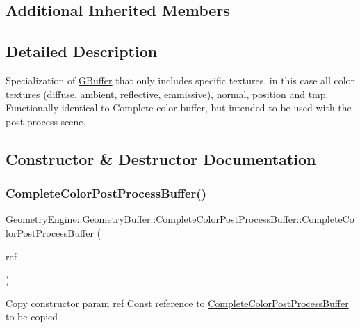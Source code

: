 \subsection*{Additional Inherited Members}


\subsection{Detailed Description}
Specialization of \mbox{\hyperlink{class_geometry_engine_1_1_geometry_buffer_1_1_g_buffer}{G\+Buffer}} that only includes specific textures, in this case all color textures (diffuse, ambient, reflective, emmissive), normal, position and tmp. Functionally identical to Complete color buffer, but intended to be used with the post process scene. 

\subsection{Constructor \& Destructor Documentation}
\mbox{\label{class_geometry_engine_1_1_geometry_buffer_1_1_complete_color_post_process_buffer_a7cce9b235baaf2d45b0a6e23c80a46e8}} 
\subsubsection{\texorpdfstring{CompleteColorPostProcessBuffer()}{CompleteColorPostProcessBuffer()}}
{\footnotesize\ttfamily Geometry\+Engine\+::\+Geometry\+Buffer\+::\+Complete\+Color\+Post\+Process\+Buffer\+::\+Complete\+Color\+Post\+Process\+Buffer (\begin{DoxyParamCaption}\item[{const \mbox{\hyperlink{class_geometry_engine_1_1_geometry_buffer_1_1_complete_color_post_process_buffer}{Complete\+Color\+Post\+Process\+Buffer}} \&}]{ref }\end{DoxyParamCaption})}

Copy constructor param ref Const reference to \mbox{\hyperlink{class_geometry_engine_1_1_geometry_buffer_1_1_complete_color_post_process_buffer}{Complete\+Color\+Post\+Process\+Buffer}} to be copied 

